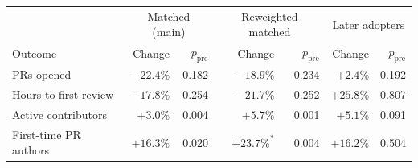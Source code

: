 \begin{tabular}{lrrrrrr}
\toprule
 & \multicolumn{2}{c}{Matched (main)} & \multicolumn{2}{c}{Reweighted matched} & \multicolumn{2}{c}{Later adopters} \\
Outcome & Change & $p_{\text{pre}}$ & Change & $p_{\text{pre}}$ & Change & $p_{\text{pre}}$ \\
\midrule
PRs opened & $-22.4\%$ & 0.182 & $-18.9\%$ & 0.234 & $+2.4\%$ & 0.192 \\
Hours to first review & $-17.8\%$ & 0.254 & $-21.7\%$ & 0.252 & $+25.8\%$ & 0.807 \\
Active contributors & $+3.0\%$ & 0.004 & $+5.7\%$ & 0.001 & $+5.1\%$ & 0.091 \\
First-time PR authors & $+16.3\%$ & 0.020 & $+23.7\%^{*}$ & 0.004 & $+16.2\%$ & 0.504 \\
\bottomrule
\end{tabular}
